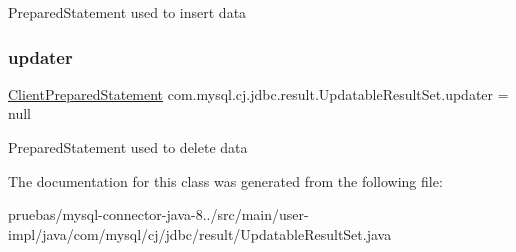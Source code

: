 Prepared\+Statement used to insert data \mbox{\label{classcom_1_1mysql_1_1cj_1_1jdbc_1_1result_1_1_updatable_result_set_a9102f47e2a47b392b64e246fdf8a0640}} 
\subsubsection{\texorpdfstring{updater}{updater}}
{\footnotesize\ttfamily \mbox{\hyperlink{classcom_1_1mysql_1_1cj_1_1jdbc_1_1_client_prepared_statement}{Client\+Prepared\+Statement}} com.\+mysql.\+cj.\+jdbc.\+result.\+Updatable\+Result\+Set.\+updater = null\hspace{0.3cm}{\ttfamily [protected]}}

Prepared\+Statement used to delete data 

The documentation for this class was generated from the following file\+:\begin{DoxyCompactItemize}
\item 
pruebas/mysql-\/connector-\/java-\/8../src/main/user-\/impl/java/com/mysql/cj/jdbc/result/Updatable\+Result\+Set.\+java\end{DoxyCompactItemize}
